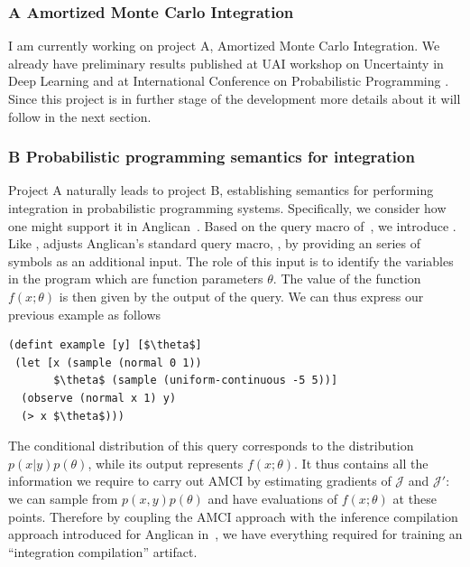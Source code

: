 \documentclass[12pt]{article}
\begin{document}
\subsubsection*{A \quad Amortized Monte Carlo Integration}
I am currently working on project A, Amortized Monte Carlo Integration. 
We already have preliminary results published at UAI workshop on Uncertainty in Deep Learning \citep{golinski2018uai} and at International Conference on Probabilistic Programming \citep{golinski2018probprog}. 
Since this project is in further stage of the development more details about it will follow in the next section.


\subsubsection*{B \quad Probabilistic programming semantics for integration}
Project A naturally leads to project B, establishing semantics for performing integration in probabilistic programming systems.
Specifically, we consider 
how one might support it in Anglican~\citep{anglican}.
Based on the query macro  of~\citep{rainforth2016bopp}, 
we introduce .  Like ,  adjusts Anglican's
standard query macro, , by providing an series of symbols as an additional input.
The role of this input is to identify the variables in the program which
are function parameters $\theta$.  The value of the 
function $f(x;\theta)$ is then given by the output of the query.
We can thus express our previous
example as follows
\begin{lstlisting}[basicstyle=\ttfamily\small,frame=none]
(defint example [y] [$\theta$]
 (let [x (sample (normal 0 1))
       $\theta$ (sample (uniform-continuous -5 5))]
  (observe (normal x 1) y)
  (> x $\theta$)))
\end{lstlisting}
The conditional distribution of this query corresponds to the distribution
$p(x|y)p(\theta)$, while its output represents $f(x;\theta)$.  It thus
contains all the information we require to carry out AMCI by estimating
gradients of $\mathcal{J}$ and $\mathcal{J}'$:
we can sample from $p(x,y)p(\theta)$ and have evaluations of
$f(x;\theta)$ at these points.  Therefore by coupling the AMCI approach
with the inference compilation approach introduced for Anglican
in~\cite{LeEtAl2016}, we have everything required for
training an ``integration compilation'' artifact.
\end{document}
